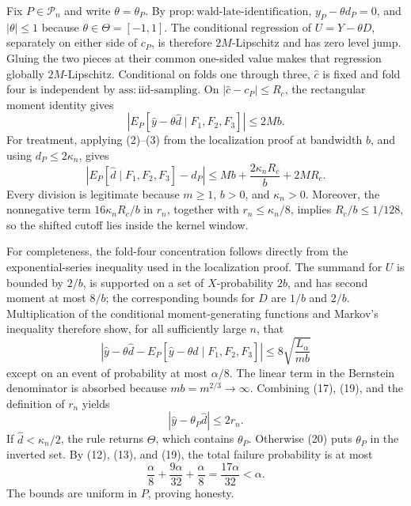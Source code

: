 Fix \(P\in\mathcal P_n\) and write \(\theta=\theta_P\).  By
\(\mathrm{prop:wald\mbox{-}late\mbox{-}identification}\),
\(y_P-\theta d_P=0\), and \(|\theta|\le1\) because
\(\theta\in\Theta=[-1,1]\).  The conditional regression of
\(U=Y-\theta D\), separately on either side of \(c_P\), is therefore
\(2M\)-Lipschitz and has zero level jump.  Gluing the two pieces at
their common one-sided value makes that regression globally
\(2M\)-Lipschitz.  Conditional on folds one through three,
\(\widehat c\) is fixed and fold four is independent by
\(\mathrm{ass:iid\mbox{-}sampling}\).  On
\(|\widehat c-c_P|\le R_c\), the rectangular moment identity gives
\[
 \left|E_P\left[
 \widehat y-\theta\widehat d\mid F_1,F_2,F_3\right]\right|
 \le2Mb. \tag{17}
\]
For treatment, applying (2)--(3) from the localization proof at
bandwidth \(b\), and using \(d_P\le2\kappa_n\), gives
\[
 \left|E_P[\widehat d\mid F_1,F_2,F_3]-d_P\right|
 \le Mb+\frac{2\kappa_nR_c}{b}+2MR_c. \tag{18}
\]
Every division is legitimate because \(m\ge1\), \(b>0\), and
\(\kappa_n>0\).  Moreover, the nonnegative term
\(16\kappa_nR_c/b\) in \(r_n\), together with
\(r_n\le\kappa_n/8\), implies \(R_c/b\le1/128\), so the shifted
cutoff lies inside the kernel window.

For completeness, the fold-four concentration follows directly from
the exponential-series inequality used in the localization proof.
The summand for \(U\) is bounded by \(2/b\), is supported on a set of
\(X\)-probability \(2b\), and has second moment at most \(8/b\); the
corresponding bounds for \(D\) are \(1/b\) and \(2/b\).  Multiplication
of the conditional moment-generating functions and Markov's inequality
therefore show, for all sufficiently large \(n\), that
\[
 \left|\widehat y-\theta\widehat d
 -E_P[\widehat y-\theta\widehat d\mid F_1,F_2,F_3]\right|
 \le8\sqrt{\frac{L_\alpha}{mb}} \tag{19}
\]
except on an event of probability at most \(\alpha/8\).  The linear
term in the Bernstein denominator is absorbed because
\(mb=m^{2/3}\to\infty\).  Combining (17), (19), and the definition of
\(r_n\) yields
\[
 |\widehat y-\theta_P\widehat d|\le2r_n. \tag{20}
\]
If \(\widehat d<\kappa_n/2\), the rule returns \(\Theta\), which
contains \(\theta_P\).  Otherwise (20) puts \(\theta_P\) in the
inverted set.  By (12), (13), and (19), the total failure probability
is at most
\[
 \frac\alpha8+\frac{9\alpha}{32}+\frac\alpha8
 =\frac{17\alpha}{32}<\alpha.
\]
The bounds are uniform in \(P\), proving honesty.

